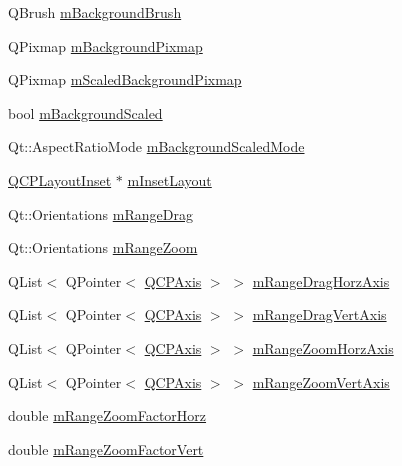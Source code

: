 \begin{DoxyCompactItemize}
\item 
Q\+Brush \mbox{\hyperlink{class_q_c_p_axis_rect_a5748e1a37f63c428e38b0a7724b46259}{m\+Background\+Brush}}
\item 
Q\+Pixmap \mbox{\hyperlink{class_q_c_p_axis_rect_a38fb1a15f43228a0c124553649303722}{m\+Background\+Pixmap}}
\item 
Q\+Pixmap \mbox{\hyperlink{class_q_c_p_axis_rect_aa74b9415598d59b49290e41e42d7ee27}{m\+Scaled\+Background\+Pixmap}}
\item 
bool \mbox{\hyperlink{class_q_c_p_axis_rect_a5ad835f0fae5d7cc5ada9e063641dbf1}{m\+Background\+Scaled}}
\item 
Qt\+::\+Aspect\+Ratio\+Mode \mbox{\hyperlink{class_q_c_p_axis_rect_a859fd368e794663e346b4f53f35078e9}{m\+Background\+Scaled\+Mode}}
\item 
\mbox{\hyperlink{class_q_c_p_layout_inset}{Q\+C\+P\+Layout\+Inset}} $\ast$ \mbox{\hyperlink{class_q_c_p_axis_rect_a255240399e0fd24baad80cbbe46f698a}{m\+Inset\+Layout}}
\item 
Qt\+::\+Orientations \mbox{\hyperlink{class_q_c_p_axis_rect_aa9f107f66ca3469ad50ee6cea7c9e237}{m\+Range\+Drag}}
\item 
Qt\+::\+Orientations \mbox{\hyperlink{class_q_c_p_axis_rect_a215eff671d48df2edccc36e7f976f28c}{m\+Range\+Zoom}}
\item 
Q\+List$<$ Q\+Pointer$<$ \mbox{\hyperlink{class_q_c_p_axis}{Q\+C\+P\+Axis}} $>$ $>$ \mbox{\hyperlink{class_q_c_p_axis_rect_abd4f1d854b41a9c6730f3a3d605c42af}{m\+Range\+Drag\+Horz\+Axis}}
\item 
Q\+List$<$ Q\+Pointer$<$ \mbox{\hyperlink{class_q_c_p_axis}{Q\+C\+P\+Axis}} $>$ $>$ \mbox{\hyperlink{class_q_c_p_axis_rect_a3b0a86e5bb136a458d7bc20773e45853}{m\+Range\+Drag\+Vert\+Axis}}
\item 
Q\+List$<$ Q\+Pointer$<$ \mbox{\hyperlink{class_q_c_p_axis}{Q\+C\+P\+Axis}} $>$ $>$ \mbox{\hyperlink{class_q_c_p_axis_rect_aa35eeb02f68b63f2069fcc80c9334b91}{m\+Range\+Zoom\+Horz\+Axis}}
\item 
Q\+List$<$ Q\+Pointer$<$ \mbox{\hyperlink{class_q_c_p_axis}{Q\+C\+P\+Axis}} $>$ $>$ \mbox{\hyperlink{class_q_c_p_axis_rect_aafb0e243294c158668499fd62cee057c}{m\+Range\+Zoom\+Vert\+Axis}}
\item 
double \mbox{\hyperlink{class_q_c_p_axis_rect_ad08d0250ed7b99de387d0ea6c7fd4dc1}{m\+Range\+Zoom\+Factor\+Horz}}
\item 
double \mbox{\hyperlink{class_q_c_p_axis_rect_a32f063629581d5bf82b12769940b34ad}{m\+Range\+Zoom\+Factor\+Vert}}

\end{DoxyCompactItemize}
